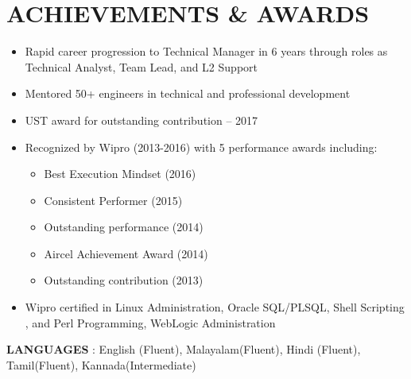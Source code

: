 \documentclass[11pt]{article}
\begin{document}
	\section*{{\fontsize{15}{0}\selectfont A}CHIEVEMENTS \& AWARDS} \vspace{-1em}
	\begin{itemize}
		\item Rapid career progression to Technical Manager in 6 years through roles as Technical Analyst, Team Lead, and L2 Support
		\item Mentored 50+ engineers in technical and professional development
		\item UST award for outstanding contribution – 2017
		\item Recognized by Wipro (2013-2016) with 5 performance awards including:
		\begin{itemize}
			\item Best Execution Mindset (2016)
			\item Consistent Performer (2015)
			\item Outstanding performance (2014)
			\item Aircel Achievement Award (2014)
			\item Outstanding contribution (2013)
		\end{itemize}
		\item Wipro certified in Linux Administration, Oracle SQL/PLSQL, Shell Scripting , and Perl Programming, WebLogic Administration
	\end{itemize}
	
	\textbf{LANGUAGES} : English (Fluent), Malayalam(Fluent), Hindi (Fluent), Tamil(Fluent), Kannada(Intermediate)
	
\end{document}

